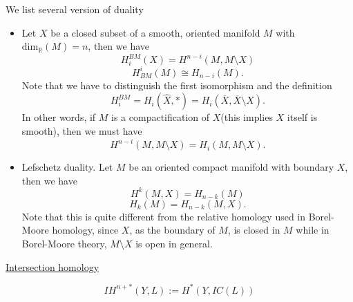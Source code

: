 \documentclass[../main.tex]{subfiles}
\begin{document}
\begin{example}
We list several version of \Poincare duality
\begin{itemize}
\item Let $X$ be a closed subset of a smooth, oriented manifold $M$ with $\mathrm{dim}_{\mathbb{R}}(M)=n$, then we have $$H_{i}^{BM}(X)=H^{n-i}(M, M\setminus X)$$
$$H^{i}_{BM}(M)\cong H_{n-i}(M).$$
Note that we have to distinguish the first isomorphism and the definition 
$$H_{i}^{BM}=H_{i}(\hat{X}, *)=H_{i}(\overline{X}, \overline{X}\setminus X).$$
In other words, if $M$ is a compactification of $X$(this implies $X$ itself is smooth), then we must have 
$$H^{n-i}(M, M\setminus X)=H_{i}(M, M\setminus X).$$
\item Lefschetz duality. Let $M$ be an oriented compact manifold with boundary $X$, then we have
$$H^{k}(M,X)=H_{n-k}(M)$$
$$H_{k}(M)=H_{n-k}(M, X).$$
Note that this is quite different from the relative homology used in Borel-Moore homology, since $X$, as the boundary of $M$, is closed in $M$ while in Borel-Moore theory, $M\setminus X$ is open in general.
\end{itemize}
\end{example}
\begin{remark}
\href{https://www.math.wisc.edu/~maxim/853notes.pdf}{Intersection homology}
\end{remark}
\begin{example}

\end{example}

\begin{example}

\end{example}

\begin{example}
$$IH^{n+*}(Y, L):=H^{*}(Y, IC(L))$$
\end{example}
\end{document}
